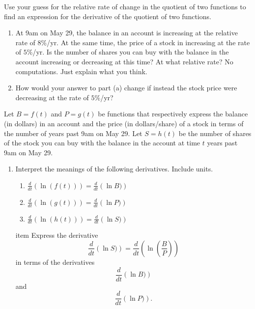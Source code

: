 \documentclass{ximera}
\begin{document}
\begin{question}  \label{QPeferreson}
Use your guess for the relative rate of change in the quotient of two functions to find an expression for the derivative of the quotient of two functions.
\end{question}



\begin{question} \label{QODFoferREG}

\begin{enumerate}

\item At 9am on May 29, the balance in an account is increasing at the relative rate of $8\%$/yr. At the same time, the price of a stock in increasing at the rate of $5\%$/yr. Is the number of shares you can buy with the balance in the account increasing or decreasing at this time? At what relative rate? No computations. Just explain what you think.

\item How would your answer to part (a) change if instead the stock price were decreasing at the rate of $5\%$/yr?

\end{enumerate}
\end{question}


\begin{question} \label{QPFVmefER}
 Let $B = f(t)$ and $P=g(t)$ be functions that respectively express the balance (in dollars) in an account and the price (in dollars/share) of a stock in terms of the number of years past 9am on May 29. Let $S= h(t)$ be the number of shares of the stock you can buy with the balance in the account at time $t$ years past 9am on May 29.

\begin{enumerate}

\item Interpret the meanings of the following derivatives. Include units.

\begin{enumerate}
\item $\frac{d}{dt} \left( \ln (f(t)) \right) = \frac{d}{dt} \left( \ln B) \right)$
 
\item $\frac{d}{dt} \left( \ln (g(t)) \right) = \frac{d}{dt} \left( \ln P) \right)$

\item $\frac{d}{dt} \left( \ln (h(t)) \right) = \frac{d}{dt} \left( \ln S) \right)$

\end{enumerate}

item Express the derivative
\[
 \frac{d}{dt} \left( \ln S) \right) =  \frac{d}{dt} \left( \ln  \left( \frac{B}{P}\right) \right)
\]
in terms of the derivatives
\[
 \frac{d}{dt} \left( \ln B) \right)
\]
and
\[
   \frac{d}{dt} \left( \ln P) \right) .
\]

\end{enumerate}
\end{question}
\end{document}
